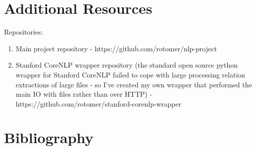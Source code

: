 \documentclass[11pt,a4paper]{article}
\begin{document}
\section{Additional Resources}
Repositories:
\begin{enumerate}
  \item Main project repository - https://github.com/rotomer/nlp-project
  \item Stanford CoreNLP wrapper repository (the standard open source python wrapper for Stanford CoreNLP failed to cope with large processing relation extractions of large files - so I've created my own wrapper that performed the main IO with files rather than over HTTP) - https://github.com/rotomer/stanford-corenlp-wrapper 
\end{enumerate}

\section{Bibliography}

 
\end{document}
